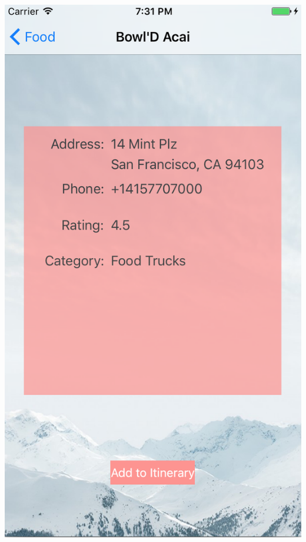 \documentclass{beamer}
\begin{document}
\begin{frame}
\begin{columns}
\begin{column}{0.3\textwidth}
        \begin{center}
            \includegraphics[scale=0.3]{foodDetail}
        \end{center}
    \end{column}
\end{columns}
\end{frame}
\end{document}
